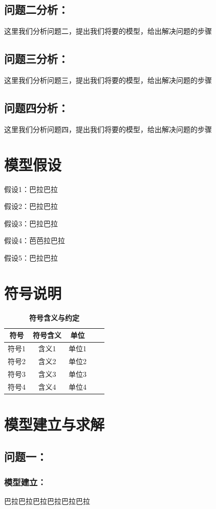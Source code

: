 \documentclass[zihao=-4,UTF8]{article}
\begin{document}
\subsection{问题二分析：}
这里我们分析问题二，提出我们将要的模型，给出解决问题的步骤
\subsection{问题三分析：}
这里我们分析问题三，提出我们将要的模型，给出解决问题的步骤
\subsection{问题四分析：}
这里我们分析问题四，提出我们将要的模型，给出解决问题的步骤

\section{模型假设}
假设1：巴拉巴拉\par
假设2：巴拉巴拉\par
假设3：巴拉巴拉\par
假设4：芭芭拉巴拉\par
假设5：巴拉巴拉

\section{符号说明}
\begin{table}[ht]
  \centering
  \caption{\textbf{符号含义与约定}}
  \label{tab:waterpump}
  \begin{tabular}{ccccc}
  \toprule
  符号 & 符号含义& 单位\\
  \midrule
  符号1& 含义1& 单位1\\
  符号2& 含义2& 单位2\\
  符号3& 含义3& 单位3\\
  符号4& 含义4& 单位4\\
  \bottomrule
  \end{tabular}
\end{table}

\section{模型建立与求解}

\subsection{问题一：}
\subsubsection{模型建立：}
巴拉巴拉巴拉巴拉巴拉巴拉
\end{document}
